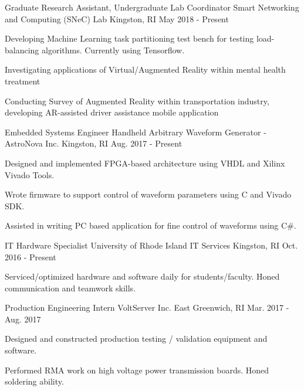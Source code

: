 \begin{cventries}
  \cventry
    {Graduate Research Assistant, Undergraduate Lab Coordinator}
    {Smart Networking and Computing (SNeC) Lab}
    {Kingston, RI}
    {May 2018 - Present}
    {
      \begin{cvitems}
        \item{Developing Machine Learning task partitioning test bench for testing load-balancing algorithms. Currently using Tensorflow.}
        \item{Investigating applications of Virtual/Augmented Reality within mental health treatment}
        \item{Conducting Survey of Augmented Reality within transportation industry, developing AR-assisted driver assistance mobile application} 
      \end{cvitems}
    }
    
  \cventry
    {Embedded Systems Engineer}
    {Handheld Arbitrary Waveform Generator - AstroNova Inc.}
    {Kingston, RI}
    {Aug. 2017 - Present}
    {
      \begin{cvitems}
        \item {Designed and implemented FPGA-based architecture using VHDL and Xilinx Vivado Tools.}
        \item {Wrote firmware to support control of waveform parameters using C and Vivado SDK.}
        \item {Assisted in writing PC based application for fine control of waveforms using C\#.}
      \end{cvitems}
    }
\cventry
    {IT Hardware Specialist}
    {University of Rhode Island IT Services}
    {Kingston, RI}
    {Oct. 2016 - Present}
    {
      \begin{cvitems}
        \item {Serviced/optimized hardware and software daily for students/faculty. Honed communication and teamwork skills.}
      \end{cvitems}
    }
  \cventry
    {Production Engineering Intern}
    {VoltServer Inc.}
    {East Greenwich, RI}
    {Mar. 2017 - Aug. 2017}
    {
      \begin{cvitems}
        \item {Designed and constructed production testing / validation equipment and software.}
        \item {Performed RMA work on high voltage power transmission boards. Honed soldering ability.}
      \end{cvitems}
    }
 \end{cventries}